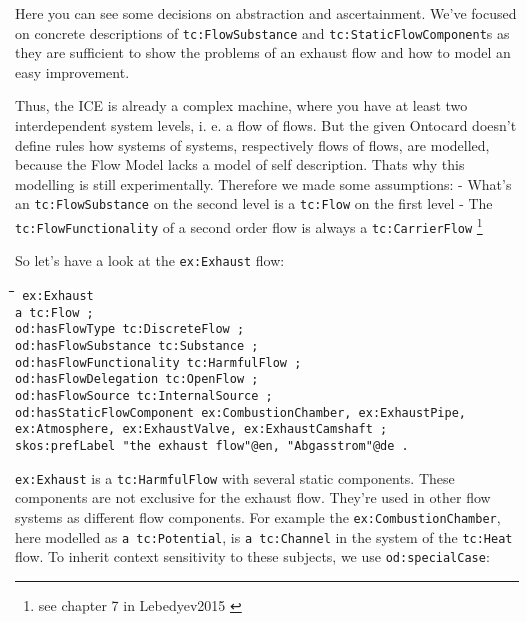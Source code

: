 \documentclass[a4paper,11pt]{article}
\newenvironment{code}{\tt \begin{tabbing}
\hskip12pt\=\hskip12pt\=\hskip12pt\=\hskip12pt\=\hskip5cm\=\hskip5cm\=\kill}
{\end{tabbing}}
\begin{document}
\begin{itemize}
    Here you can see some decisions on abstraction and ascertainment. We've
    focused on concrete descriptions of \texttt{tc:FlowSubstance} and
    \texttt{tc:StaticFlowComponent}s as they are sufficient to show the 
    problems of an exhaust flow and how to model an easy improvement.

    Thus, the ICE is already a complex machine, where you have at least
    two interdependent system levels, i. e. a flow of flows. But the given 
    Ontocard doesn't define rules how systems of systems, respectively flows 
    of flows, are modelled, because the Flow Model lacks a model of self 
    description. Thats why this modelling is still experimentally. Therefore we
    made some assumptions:
    - What's an \texttt{tc:FlowSubstance} on the second level is a 
    \texttt{tc:Flow} on the first level
    - The \texttt{tc:FlowFunctionality} of a second order flow is always a 
    \texttt{tc:CarrierFlow} \footnote{see chapter 7 in Lebedyev2015 
    \cite{Lebedyev2015} }

    So let's have a look at the \texttt{ex:Exhaust} flow:
    \begin{code}\tt
        ex:Exhaust \\
        \> a tc:Flow ; \\
        \> od:hasFlowType tc:DiscreteFlow ; \\
        \> od:hasFlowSubstance tc:Substance ; \\
        \> od:hasFlowFunctionality tc:HarmfulFlow ; \\
        \> od:hasFlowDelegation tc:OpenFlow ; \\
        \> od:hasFlowSource tc:InternalSource ; \\
        \> od:hasStaticFlowComponent ex:CombustionChamber, ex:ExhaustPipe, \\
        \> ex:Atmosphere, ex:ExhaustValve, ex:ExhaustCamshaft ; \\
        \> skos:prefLabel "the exhaust flow"@en, "Abgasstrom"@de . \\
    \end{code}

    \texttt{ex:Exhaust} is a \texttt{tc:HarmfulFlow} with several static 
    components. These components are not exclusive for the exhaust flow.
    They're used in other flow systems as different flow components. For
    example the \texttt{ex:CombustionChamber}, here modelled as
    \texttt{a tc:Potential}, is \texttt{a tc:Channel} in the system of the
    \texttt{tc:Heat} flow. To inherit context sensitivity to these 
    subjects, we use \texttt{od:specialCase}: \cite{RDFC}
    

\end{itemize}
\end{document}
